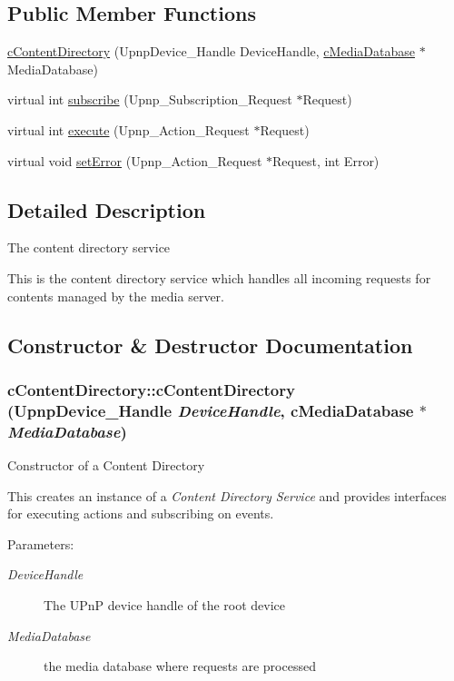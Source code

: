 \subsection*{Public Member Functions}
\begin{CompactItemize}
\item 
\hyperlink{classcContentDirectory_aca0fe0cffa30b1040719720ff4b82a2}{cContentDirectory} (UpnpDevice\_\-Handle DeviceHandle, \hyperlink{classcMediaDatabase}{cMediaDatabase} $\ast$MediaDatabase)
\item 
virtual int \hyperlink{classcContentDirectory_17acd376a722e6e7de9ec0d4cabb707b}{subscribe} (Upnp\_\-Subscription\_\-Request $\ast$Request)
\item 
virtual int \hyperlink{classcContentDirectory_a0225df761512819b9c46f45b2a0f0d0}{execute} (Upnp\_\-Action\_\-Request $\ast$Request)
\item 
virtual void \hyperlink{classcContentDirectory_a3b0df304987a0f2b17733c651d5b5c6}{setError} (Upnp\_\-Action\_\-Request $\ast$Request, int Error)
\end{CompactItemize}


\subsection{Detailed Description}
The content directory service

This is the content directory service which handles all incoming requests for contents managed by the media server. 

\subsection{Constructor \& Destructor Documentation}
\hypertarget{classcContentDirectory_aca0fe0cffa30b1040719720ff4b82a2}{
\subsubsection[{cContentDirectory}]{\setlength{\rightskip}{0pt plus 5cm}cContentDirectory::cContentDirectory (UpnpDevice\_\-Handle {\em DeviceHandle}, \/  {\bf cMediaDatabase} $\ast$ {\em MediaDatabase})}}
\label{classcContentDirectory_aca0fe0cffa30b1040719720ff4b82a2}


Constructor of a Content Directory

This creates an instance of a {\em Content Directory Service\/} and provides interfaces for executing actions and subscribing on events. \begin{Desc}
\item[Parameters:]
\begin{description}
\item[{\em DeviceHandle}]The UPnP device handle of the root device \item[{\em MediaDatabase}]the media database where requests are processed \end{description}
\end{Desc}


